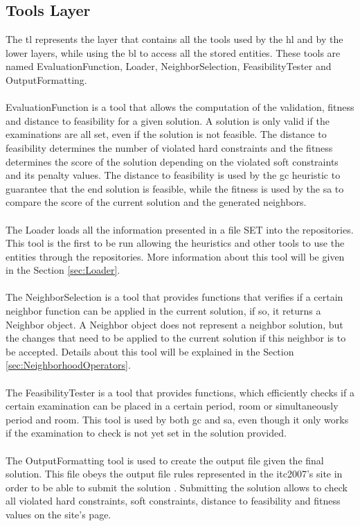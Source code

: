 \subsection{Tools Layer}
The \gls{tl} represents the layer that contains all the tools used by the \gls{hl} and by the lower layers, while using the \gls{bl} to access all the stored entities. These tools are named EvaluationFunction, Loader, NeighborSelection, FeasibilityTester and OutputFormatting.\\
\\
EvaluationFunction is a tool that allows the computation of the validation, fitness and distance to feasibility for a given solution. A solution is only valid if the examinations are all set, even if the solution is not feasible. The distance to feasibility determines the number of violated hard constraints and the fitness determines the score of the solution depending on the violated soft constraints and its penalty values. The distance to feasibility is used by the \gls{gc} heuristic to guarantee that the end solution is feasible, while the fitness is used by the \gls{sa} to compare the score of the current solution and the generated neighbors.\\
\\
The Loader loads all the information presented in a file SET into the repositories. This tool is the first to be run allowing the heuristics and other tools to use the entities through the repositories. More information about this tool will be given in the Section \ref{sec:Loader}.\\
\\
The NeighborSelection is a tool that provides functions that verifies if a certain neighbor function can be applied in the current solution, if so, it returns a Neighbor object. A Neighbor object does not represent a neighbor solution, but the changes that need to be applied to the current solution if this neighbor is to be accepted. Details about this tool will be explained in the Section \ref{sec:NeighborhoodOperators}.\\
\\
The FeasibilityTester is a tool that provides functions, which efficiently checks if a certain examination can be placed in a certain period, room or simultaneously period and room. This tool is used by both \gls{gc} and \gls{sa}, even though it only works if the examination to check is not yet set in the solution provided.\\
\\
The OutputFormatting tool is used to create the output file given the final solution. This file obeys the output file rules represented in the \gls{itc2007}'s site \cite{McCollum2007b} in order to be able to submit the solution \cite{McCollum2007c}. Submitting the solution allows to check all violated hard constraints, soft constraints, distance to feasibility and fitness values on the site's page.

